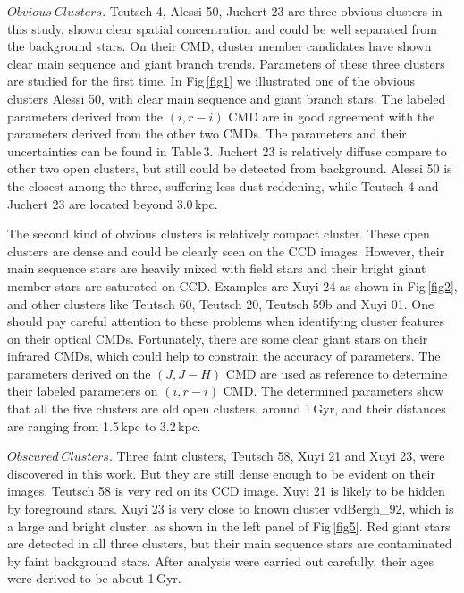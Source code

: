 \documentclass[]{raa_rb}
\begin{document}
\vspace{3ex}
$Obvious~Clusters.$ Teutsch 4, Alessi 50, Juchert 23 are three obvious clusters in this study, shown clear spatial concentration and could be well separated from the background stars. On their CMD, cluster member candidates have shown clear main sequence and giant branch trends.  Parameters of these three clusters are studied for the first time.
In Fig\,\ref{fig1} we illustrated one of the obvious clusters Alessi 50, with clear main sequence and giant branch stars. 
The labeled parameters derived from the $(i, r-i)$ CMD are in good agreement with the parameters derived from the other two CMDs. The parameters and their uncertainties can be found in Table\,3.  Juchert 23 is relatively diffuse compare to other two open clusters, but still could be detected from background.  Alessi 50 is the closest among the three, suffering less dust reddening, while Teutsch 4 and Juchert 23 are located beyond 3.0\,kpc.  



The second kind of obvious clusters is relatively compact cluster. These open clusters are dense and could be clearly seen on the CCD images. However, their main sequence stars are heavily mixed with field stars and their bright giant member stars are saturated on CCD. Examples are Xuyi 24 as shown in Fig\,\ref{fig2}, and other clusters like Teutsch 60, Teutsch 20, Teutsch 59b and Xuyi 01. One should pay careful attention to these problems when identifying cluster features on their optical CMDs. 
Fortunately, there are some clear giant stars on their infrared CMDs, which could help to constrain the accuracy of parameters. 
The parameters derived on the $(J,J-H)$ CMD are used as reference to determine their labeled parameters on $(i, r-i)$ CMD.
The determined parameters show that all the five clusters are old open clusters, around 1\,Gyr, and their distances are ranging from 1.5\,kpc to 3.2\,kpc. 


\vspace{3ex}
$Obscured~Clusters.$ Three faint clusters, Teutsch 58, Xuyi 21 and Xuyi 23, were discovered in this work. But they are still dense enough to be evident on their images. Teutsch 58 is very red on its CCD image.  Xuyi 21 is likely to be hidden by foreground stars. Xuyi 23 is very close to known cluster vdBergh\_92, which is a large and bright cluster, as shown in the left panel of Fig\,\ref{fig5}.  Red giant stars are detected in all three clusters, but their main sequence stars are contaminated by faint background stars. After analysis were carried out carefully, their ages were derived to be about 1\,Gyr.
\end{document}
